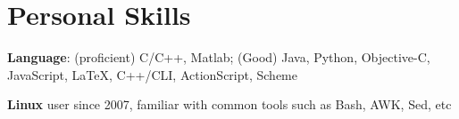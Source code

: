 \documentclass[letterpaper]{article}
\renewenvironment{itemize}{
\begin{list}{*}{
    \setlength{\leftmargin}{1.5em}
    \setlength{\itemsep}{0pt}
  }
}{
  \end{list}
}
\begin{document}
\section*{Personal Skills}
\begin{itemize}
\item \textbf{Language}: (proficient) C/C++, Matlab; (Good) Java, Python, Objective-C, JavaScript, \LaTeX, C++/CLI, ActionScript, Scheme
\item \textbf{Linux} user since 2007, familiar with common tools such as Bash, AWK, Sed, etc
%
%
\end{itemize}
\end{document}
